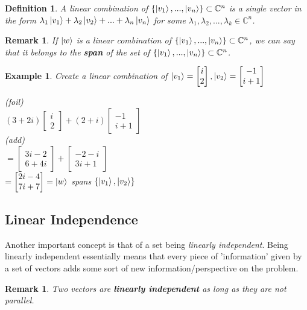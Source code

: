 \documentclass[12pt]{article}
\theoremstyle{plain}
\theoremstyle{nonumberplain}
\theoremstyle{plain}
\newtheorem{definition}[lemma]{Definition}
\newtheorem{example}[lemma]{Example}
\newtheorem{remark}[lemma]{Remark}
\theoremstyle{nonumberplain}
\newcommand\1{{\bf 1}}
\newcommand{\bmat}[1]{\begin{bmatrix*} #1 \end{bmatrix*}} %
\newcommand{\C}{\mathbb{C}} %
\newcommand{\<}{\left\langle}
\renewcommand{\>}{\right\rangle}
\begin{document}
\begin{definition}\label{def:li}
A linear combination of $\lbrace\ket{v_1}, ..., \ket{v_n}\rbrace\subset\C^n$ is a single vector in the form $\lambda_1\ket{v_1} + \lambda_2\ket{v_2} + ... + \lambda_n\ket{v_n}$ for some $\lambda_1, \lambda_2, ... , \lambda_k\in\C^n$.
\end{definition}

\begin{remark}
If $\ket{w}$ is a linear combination of $\lbrace\ket{v_1}, ..., \ket{v_n}\rbrace\subset\C^n$, we can say that it belongs to the \textbf{span} of the set of $\lbrace\ket{v_1}, ..., \ket{v_n}\rbrace\subset\C^n$.
\end{remark}

\begin{example}
Create a linear combination of $\ket{v_1}=\bmat{i \\ 2}, \ket{v_2}=\bmat{-1 \\ i+1}$
\begin{center}
(\textit{foil}) \\
$(3+2i)\bmat{i \\ 2} + (2+i)\bmat{-1 \\ i+1}$ \\
(\textit{add}) \\
$=\bmat{3i-2 \\ 6+4i} + \bmat{-2-i \\ 3i+1}$ \\
$=\bmat{2i-4 \\ 7i+7}=\ket{w}$ \textit{spans} $\lbrace\ket{v_1}, \ket{v_2}\rbrace$
\end{center}
\end{example}


\subsection{Linear Independence}
Another important concept is that of a set being \textit{linearly independent}. Being linearly independent essentially means that every piece of 'information' given by a set of vectors adds some sort of new information/perspective on the problem.

\begin{remark}
Two vectors are \textbf{linearly independent} as long as they are not \textit{parallel}.
\end{remark}
\end{document}

